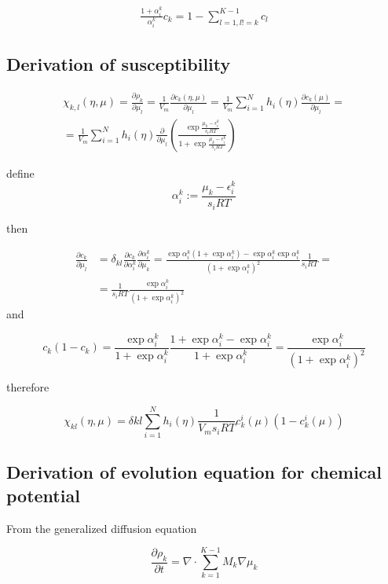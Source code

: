 \documentclass[11pt]{article}
\begin{document}
\begin{align*}
\frac{1+\alpha_i^k}{\alpha_i^k} c_k = 1-\sum_{l=1, l!=k}^{K-1} c_l
\end{align*}


\subsection{Derivation of susceptibility}
\label{sec:orgc44efe4}

\begin{align*}
\chi_{k,l}(\eta, \mu) = \frac{\partial \rho_k}{\partial \mu_l} = \frac{1}{V_m} \frac{\partial c_k(\eta, \mu)}{\partial \mu_l} = \frac{1}{V_m} \sum_{i=1}^N h_i(\eta) \frac{\partial c_k(\mu)}{\partial \mu_l} = \\
 = \frac{1}{V_m} \sum_{i=1}^N h_i(\eta) \frac{\partial}{\partial \mu_l}\left( \frac{\exp{\frac{\mu_k - \epsilon^k_i}{s_i R T}}}{1 + \exp{\frac{\mu_k - \epsilon^k_i}{s_i R T}}} \right)
\end{align*}

define
$$
\alpha^k_i := \frac{\mu_k - \epsilon^k_i}{s_i R T}
$$

then

\begin{align*}
\frac{\partial c_k}{\partial \mu_l} &= \delta_{kl} \frac{\partial c_k}{\partial \alpha_i^k} \frac{\partial \alpha_i^k}{\partial \mu_k} = \frac{\exp{\alpha^k_i} (1+\exp{\alpha^k_i}) - \exp{\alpha^k_i} \exp{\alpha^k_i}}{(1+\exp{\alpha^k_i})^2} \frac{1}{s_i R T} = \\
&= \frac{1}{s_i R T} \frac{\exp{\alpha^k_i}}{(1+\exp{\alpha^k_i})^2}
\end{align*}
and

$$
c_k (1-c_k) = \frac{\exp{\alpha^k_i}}{1+\exp{\alpha^k_i}} \frac{1+\exp{\alpha^k_i} - \exp{\alpha^k_i}}{1+\exp{\alpha^k_i}} = \frac{\exp{\alpha^k_i}}{(1+\exp{\alpha^k_i})^2}
$$

therefore

$$
\chi_{kl}(\eta, \mu) = \delta{kl} \sum_{i=1}^N h_i(\eta) \frac{1}{V_m s_i R T} c^i_k(\mu) (1-c^i_k(\mu))
$$




\subsection{Derivation of evolution equation for chemical potential}
\label{sec:org7570298}

From the generalized diffusion equation

$$
\frac{\partial \rho_k}{\partial t} = \nabla \cdot \sum_{k=1}^{K-1} M_k \nabla \mu_k
$$
\end{document}
